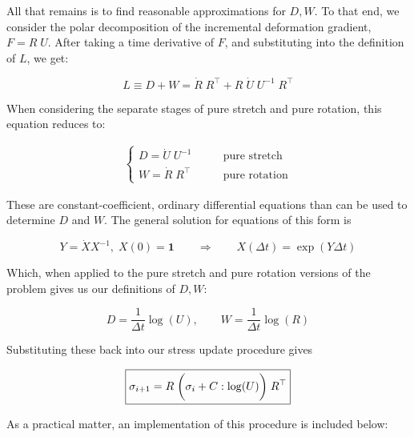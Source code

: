 All that remains is to find reasonable approximations for $D, W$. To that end, we
consider the polar decomposition of the incremental deformation gradient, 
$F = R \; U$. After taking a time derivative of $F$, and substituting into the
definition of $L$, we get:

$$ L \equiv D + W = \dot{R} \; R^\top + R \; \dot{U} \; U^{-1} \; R^\top $$

When considering the separate stages of pure stretch and pure rotation, this
equation reduces to:

\begin{align*}
\begin{cases}
D = \dot{U} \; U^{-1} & \qquad \text{pure stretch} \\
W = \dot{R} \; R^\top & \qquad \text{pure rotation}
\end{cases}
\end{align*}

These are constant-coefficient, ordinary differential equations
than can be used to determine $D$ and $W$. The
general solution for equations of this form is

$$ 
Y = \dot{X} X^{-1}, \; X(0) = \mathbf{1} 
\qquad 
\Longrightarrow 
\qquad 
X(\Delta t) = \exp(Y \Delta t)
$$

Which, when applied to the pure stretch and pure rotation versions of the problem
gives us our definitions of $D, W$:

$$ D = \frac{1}{\Delta t} \log(U), \qquad W = \frac{1}{\Delta t} \log(R) $$

Substituting these back into our stress update procedure gives 

$$\boxed{\sigma_{i+1} = R \; \displaystyle \bigg( \sigma_i + C : \log(U) \bigg) \; R^\top}$$

As a practical matter, an implementation of this procedure is included below:


